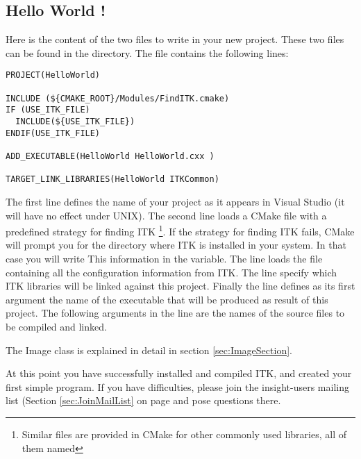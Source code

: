 \subsection{Hello World !}
\label{sec:HelloWorldITK}


Here is the content of the two files to write in your new project. These two
files can be found in the  directory. The
 file contains the following lines:

\begin{verbatim}
PROJECT(HelloWorld)

INCLUDE (${CMAKE_ROOT}/Modules/FindITK.cmake)
IF (USE_ITK_FILE)
  INCLUDE(${USE_ITK_FILE})
ENDIF(USE_ITK_FILE)

ADD_EXECUTABLE(HelloWorld HelloWorld.cxx )

TARGET_LINK_LIBRARIES(HelloWorld ITKCommon)
\end{verbatim}

The first line defines the name of your project as it appears in Visual
Studio (it will have no effect under UNIX). The second line loads a CMake
file with a predefined strategy for finding ITK \footnote{Similar files are
provided in CMake for other commonly used libraries, all of them named
}. If the strategy for finding ITK fails, CMake will prompt
you for the directory where ITK is installed in your system. In that case you
will write This information in the  variable. The line  loads the  file containing
all the configuration information from ITK. The  line
specify which ITK libraries will be linked against this project. Finally the
line
 defines as its first argument the name of the executable
that will be produced as result of this project. The following arguments in
the line are the names of the source files to be compiled and linked.



The Image class is explained in detail in section \ref{sec:ImageSection}.

At this point you have successfully installed and compiled ITK, and created
your first simple program. If you have difficulties, please join the
insight-users mailing list (Section \ref{sec:JoinMailList} on page
\pageref{sec:JoinMailList} and pose questions there.
